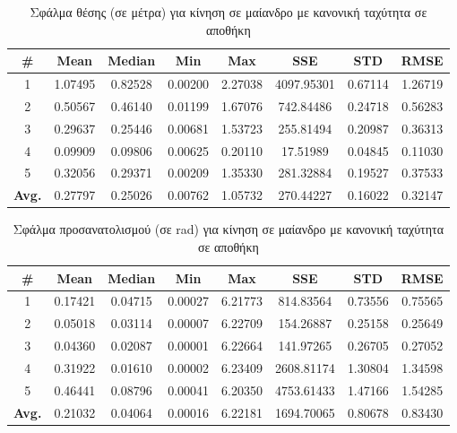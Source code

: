 \begin{table}[H]
    \begin{center}
        \centering
        \caption{Σφάλμα θέσης (σε μέτρα) για κίνηση σε μαίανδρο με κανονική ταχύτητα σε αποθήκη}
        \label{tab:position_error_meander_normal_warehouse}
        \begin{tabular}{| c | c | c | c | c | c | c | c | }
        \hline
        \rowcolor{Gray}
        \# & Mean & Median & Min & Max & SSE & STD & RMSE \\
        \hline
        1 & 1.07495 & 0.82528 & 0.00200 & 2.27038 & 4097.95301 & 0.67114 & 1.26719 \\
        2 & 0.50567 & 0.46140 & 0.01199 & 1.67076 & 742.84486 & 0.24718 & 0.56283 \\
        3 & 0.29637 & 0.25446 & 0.00681 & 1.53723 & 255.81494 & 0.20987 & 0.36313 \\
        4 & 0.09909 & 0.09806 & 0.00625 & 0.20110 & 17.51989 & 0.04845 & 0.11030 \\
        5 & 0.32056 & 0.29371 & 0.00209 & 1.35330 & 281.32884 & 0.19527 & 0.37533 \\
        \hline
        \textbf{Avg.} & 0.27797 & 0.25026 & 0.00762 & 1.05732 & 270.44227 & 0.16022 & 0.32147\\
        \hline
        \end{tabular}
    \end{center}
\end{table}

\begin{table}[H]
    \centering
    \caption{Σφάλμα προσανατολισμού (σε rad) για κίνηση σε μαίανδρο με κανονική ταχύτητα σε αποθήκη}
    \label{tab:orientation_error_meander_normal_warehouse}
    \begin{tabular}{| c | c | c | c | c | c | c | c | }
        \hline
        \rowcolor{Gray}
        \# & Mean & Median & Min & Max & SSE & STD & RMSE \\
        \hline
        1 & 0.17421 & 0.04715 & 0.00027 & 6.21773 & 814.83564 & 0.73556 & 0.75565 \\
        2 & 0.05018 & 0.03114 & 0.00007 & 6.22709 & 154.26887 & 0.25158 & 0.25649 \\
        3 & 0.04360 & 0.02087 & 0.00001 & 6.22664 & 141.97265 & 0.26705 & 0.27052 \\
        4 & 0.31922 & 0.01610 & 0.00002 & 6.23409 & 2608.81174 & 1.30804 & 1.34598 \\
        5 & 0.46441 & 0.08796 & 0.00041 & 6.20350 & 4753.61433 & 1.47166 & 1.54285 \\
        \hline
        \textbf{Avg.} & 0.21032 & 0.04064 & 0.00016 & 6.22181 & 1694.70065 & 0.80678 & 0.83430 \\
        \hline
    \end{tabular}
\end{table}

